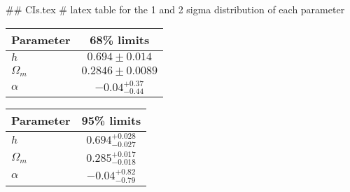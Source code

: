 ## CIs.tex
# latex table for the 1 and 2 sigma distribution of each parameter

\begin{tabular} { l  c}
 Parameter &  68\% limits\\
\hline
{\boldmath$h              $} & $0.694\pm 0.014            $\\
{\boldmath$\Omega_m       $} & $0.2846\pm 0.0089          $\\
{\boldmath$\alpha         $} & $-0.04^{+0.37}_{-0.44}     $\\
\hline
\end{tabular}

\begin{tabular} { l  c}
 Parameter &  95\% limits\\
\hline
{\boldmath$h              $} & $0.694^{+0.028}_{-0.027}   $\\
{\boldmath$\Omega_m       $} & $0.285^{+0.017}_{-0.018}   $\\
{\boldmath$\alpha         $} & $-0.04^{+0.82}_{-0.79}     $\\
\hline
\end{tabular}
